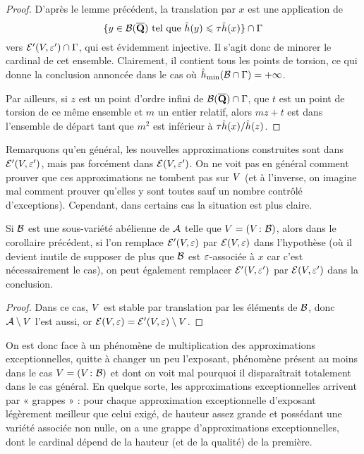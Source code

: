 \begin{proof}
  D'après le lemme précédent, la translation par \( x \) est une application
  de
  \begin{equation}
    \lbrace
      y \in \mathcal B(\overline{{\mathbf{Q}}})
      \text{ tel que }
      \hat h (y) \leqslant \tau \hat h (x)
    \rbrace
    \cap \Gamma
  \end{equation}
  vers \( \mathcal E'(V, \varepsilon') \cap \Gamma \), qui est évidemment injective. Il
  s'agit donc de minorer le cardinal de cet ensemble. Clairement, il contient
  tous les points de torsion, ce qui donne la conclusion annoncée dans le cas
  où \( \hat h_{\mathrm{min}}(\mathcal B \cap \Gamma) = + \infty \).

  Par ailleurs, si \( z \) est un point d'ordre infini de
  \( \mathcal B(\overline{{\mathbf{Q}}}) \cap \Gamma \), que \( t \) est un point de torsion de ce même
  ensemble et \( m \) un entier relatif, alors \( m z + t \) est dans
  l'ensemble de départ tant que \( m^2 \) est inférieur à
  \( \tau \hat h (x) / \hat h (z) \).
\end{proof}

Remarquons qu'en général, les nouvelles approximations construites sont dans \(
  \mathcal E'(V, \varepsilon') \), mais pas forcément dans \( \mathcal E(V, \varepsilon') \). On
ne voit pas en général comment prouver que ces approximations ne tombent pas
sur \( V \) (et à l'inverse, on imagine mal comment prouver qu'elles y
sont toutes sauf un nombre contrôlé d'exceptions). Cependant, dans certains
cas la situation est plus claire.

\begin{sco} \label{s:factory-part}
  Si \( \mathcal B \) est une sous-variété abélienne de \( \mathcal A \) telle que \(
    V = (V\colon\mathcal B) \), alors dans le corollaire précédent, si l'on
  remplace \( \mathcal E'(V, \varepsilon) \) par \( \mathcal E(V, \varepsilon) \) dans
  l'hypothèse (où il devient inutile de supposer de plus que \( \mathcal B \) est \(
    \varepsilon \)-associée à \( x \) car c'est nécessairement le cas), on peut
  également remplacer \( \mathcal E'(V, \varepsilon') \) par \( \mathcal E(V, \varepsilon') \)
  dans la conclusion.
\end{sco}

\begin{proof}
  Dans ce cas, \( V \) est stable par translation par les éléments de \(
    \mathcal B \), donc \( \mathcal A \setminus V \) l'est aussi, or \( \mathcal E(V,
    \varepsilon) = \mathcal E'(V, \varepsilon) \setminus V \).
\end{proof}

On est donc face à un phénomène de multiplication des approximations
exceptionnelles, quitte à changer un peu l'exposant, phénomène présent au
moins dans le cas \( V = (V\colon\mathcal B) \) et dont on voit mal pourquoi
il disparaîtrait totalement dans le cas général.  En quelque sorte, les
approximations exceptionnelles arrivent par « grappes » : pour chaque
approximation exceptionnelle d'exposant légèrement meilleur que celui exigé,
de hauteur assez grande et possédant une variété associée non nulle, on a une
grappe d'approximations exceptionnelles, dont le cardinal dépend de la hauteur
(et de la qualité) de la première.

